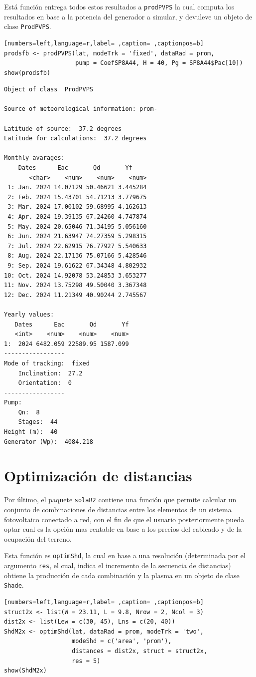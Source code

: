 \begin{itemize}
Está función entrega todos estos resultados a \texttt{prodPVPS} la cual computa los resultados en base a la potencia del generador a simular, y devuleve un objeto de clase \texttt{ProdPVPS}.
\begin{lstlisting}[numbers=left,language=r,label= ,caption= ,captionpos=b]
prodsfb <- prodPVPS(lat, modeTrk = 'fixed', dataRad = prom,
                    pump = CoefSP8A44, H = 40, Pg = SP8A44$Pac[10])
show(prodsfb)
\end{lstlisting}

\begin{verbatim}
Object of class  ProdPVPS 

Source of meteorological information: prom- 

Latitude of source:  37.2 degrees
Latitude for calculations:  37.2 degrees

Monthly avarages:
	Dates      Eac       Qd       Yf
       <char>    <num>    <num>    <num>
 1: Jan. 2024 14.07129 50.46621 3.445284
 2: Feb. 2024 15.43701 54.71213 3.779675
 3: Mar. 2024 17.00102 59.68995 4.162613
 4: Apr. 2024 19.39135 67.24260 4.747874
 5: May. 2024 20.65046 71.34195 5.056160
 6: Jun. 2024 21.63947 74.27359 5.298315
 7: Jul. 2024 22.62915 76.77927 5.540633
 8: Aug. 2024 22.17136 75.07166 5.428546
 9: Sep. 2024 19.61622 67.34348 4.802932
10: Oct. 2024 14.92078 53.24853 3.653277
11: Nov. 2024 13.75298 49.50040 3.367348
12: Dec. 2024 11.21349 40.90244 2.745567

Yearly values:
   Dates      Eac       Qd       Yf
   <int>    <num>    <num>    <num>
1:  2024 6482.059 22589.95 1587.099
-----------------
Mode of tracking:  fixed 
    Inclination:  27.2 
    Orientation:  0 
-----------------
Pump:
    Qn:  8 
    Stages:  44 
Height (m):  40 
Generator (Wp):  4084.218
\end{verbatim}
\end{itemize}

\section{Optimización de distancias}
\label{sec:org9276e38}
\label{optimizacion-distancias}
Por último, el paquete \texttt{solaR2} contiene una función que permite calcular un conjunto de combinaciones de distancias entre los elementos de un sistema fotovoltaico conectado a red, con el fin de que el usuario posteriormente pueda optar cual es la opción mas rentable en base a los precios del cableado y de la ocupación del terreno.

Esta función es \texttt{optimShd}, la cual en base a una resolución (determinada por el argumento \texttt{res}, el cual, indica el incremento de la secuencia de distancias) obtiene la producción de cada combinación y la plasma en un objeto de clase \texttt{Shade}.
\begin{lstlisting}[numbers=left,language=r,label= ,caption= ,captionpos=b]
struct2x <- list(W = 23.11, L = 9.8, Nrow = 2, Ncol = 3)
dist2x <- list(Lew = c(30, 45), Lns = c(20, 40))
ShdM2x <- optimShd(lat, dataRad = prom, modeTrk = 'two',
                   modeShd = c('area', 'prom'),
                   distances = dist2x, struct = struct2x,
                   res = 5)
show(ShdM2x)
\end{lstlisting}

